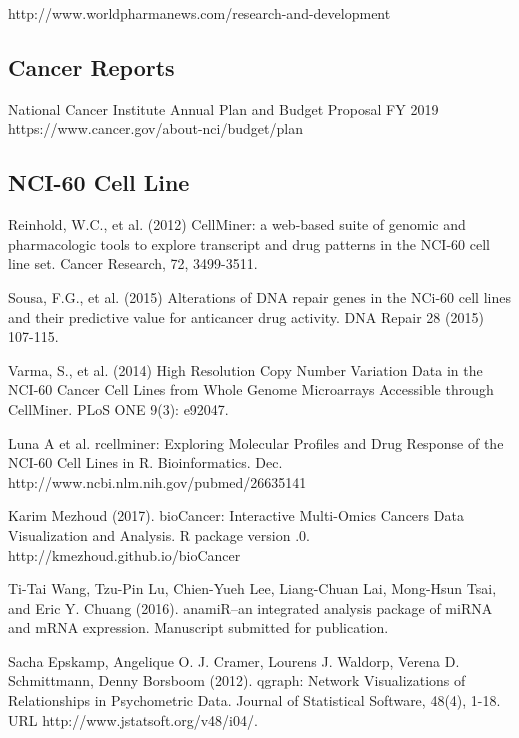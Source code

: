  http://www.worldpharmanews.com/research-and-development

\subsection{Cancer Reports}
	
 National Cancer Institute
\newblock Annual Plan and Budget Proposal FY 2019
\newblock https://www.cancer.gov/about-nci/budget/plan 


\subsection{NCI-60 Cell Line}

Reinhold, W.C., et al. (2012) 
\newblock CellMiner: a web-based suite of genomic and pharmacologic tools to explore transcript and drug patterns in the NCI-60 cell line set. 
\newblock Cancer Research, 72, 3499-3511.

Sousa, F.G., et al. (2015) 
\newblock Alterations of DNA repair genes in the NCi-60 cell lines and their predictive value for anticancer drug activity. 
\newblock DNA Repair 28 (2015) 107-115.

Varma, S., et al. (2014) 
\newblock High Resolution Copy Number Variation Data in the NCI-60 Cancer Cell Lines from Whole Genome Microarrays Accessible through CellMiner. 
\newblock PLoS ONE 9(3): e92047.

 Luna A et al. rcellminer: Exploring Molecular Profiles and
\newblock Drug Response of the NCI-60 Cell Lines in R. Bioinformatics.
 Dec. http://www.ncbi.nlm.nih.gov/pubmed/26635141

Karim Mezhoud (2017). bioCancer: Interactive Multi-Omics
\newblock Cancers Data Visualization and Analysis. R package version
.0. http://kmezhoud.github.io/bioCancer

Ti-Tai Wang, Tzu-Pin Lu, Chien-Yueh Lee, Liang-Chuan Lai, Mong-Hsun Tsai, and Eric Y. Chuang (2016). 
\newblock anamiR--an integrated analysis package of miRNA and mRNA expression.
\newblock Manuscript submitted for publication.

Sacha Epskamp, Angelique O. J. Cramer, Lourens J. Waldorp, Verena D. Schmittmann, Denny Borsboom (2012). 
\newblock qgraph: Network Visualizations of Relationships in Psychometric Data. 
\newblock Journal of Statistical Software, 48(4), 1-18. URL http://www.jstatsoft.org/v48/i04/.



